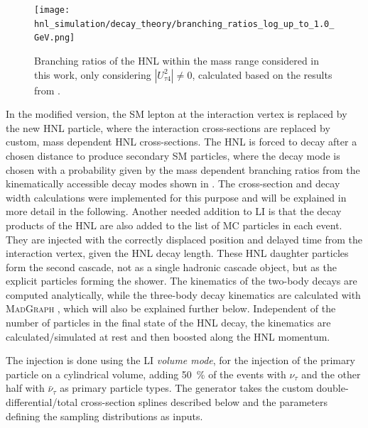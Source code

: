 \begin{figure}[h]
    \texttt{[image: hnl\_simulation/decay\_theory/branching\_ratios\_log\_up\_to\_1.0\_GeV.png]}
    \caption[HNL branching ratios]{Branching ratios of the HNL within the mass range considered in this work, only considering $|U_{\tau4}^2| \neq 0$, calculated based on the results from \cite{Coloma:2020lgy}.}
\end{figure}

In the modified version, the SM lepton at the interaction vertex is replaced by the new HNL particle, where the interaction cross-sections are replaced by custom, mass dependent HNL cross-sections. The HNL is forced to decay after a chosen distance to produce secondary SM particles, where the decay mode is chosen with a probability given by the mass dependent branching ratios from the kinematically accessible decay modes shown in . The cross-section and decay width calculations were implemented for this purpose and will be explained in more detail in the following. Another needed addition to LI is that the decay products of the HNL are also added to the list of MC particles in each event. They are injected with the correctly displaced position and delayed time from the interaction vertex, given the HNL decay length. These HNL daughter particles form the second cascade, not as a single hadronic cascade object, but as the explicit particles forming the shower. The kinematics of the two-body decays are computed analytically, while the three-body decay kinematics are calculated with \textsc{MadGraph} , which will also be explained further below. Independent of the number of particles in the final state of the HNL decay, the kinematics are calculated/simulated at rest and then boosted along the HNL momentum. 

The injection is done using the LI \textit{volume mode}, for the injection of the primary particle on a cylindrical volume, adding \SI{50}{\percent} of the events with $\nu_\tau$ and the other half with $\bar{\nu}_\tau$ as primary particle types. The generator takes the custom double-differential/total cross-section splines described below and the parameters defining the sampling distributions as inputs.



